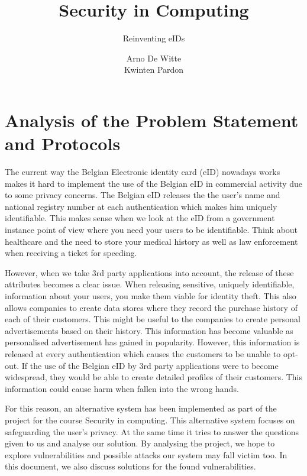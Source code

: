 \documentclass[12pt]{report}
\begin{document}
\title{Security in Computing}
\subtitle{Reinventing eIDs}
\author{Arno De Witte \\Kwinten Pardon}

\maketitle

\section{Analysis of the Problem Statement and Protocols}
The current way the Belgian Electronic identity card (eID) nowadays works makes it hard to implement the use of the Belgian eID in commercial activity due to some privacy concerns. The Belgian eID releases the the user's name and national registry number at each authentication which makes him uniquely identifiable. This makes sense when we look at the eID from a government instance point of view where you need your users to be identifiable. Think about healthcare and the need to store your medical history as well as law enforcement when receiving a ticket for speeding.

However, when we take 3rd party applications into account, the release of these attributes becomes a clear issue. When releasing sensitive, uniquely identifiable, information about your users, you make them viable for identity theft. This also allows companies to create data stores where they record the purchase history of each of their customers. This might be useful to the companies to create personal advertisements based on their history. This information has become valuable as personalised advertisement has gained in popularity. However, this information is released at every authentication which causes the customers to be unable to opt-out. If the use of the Belgian eID by 3rd party applications were to become widespread, they would be able to create detailed profiles of their customers. This information could cause harm when fallen into the wrong hands.

For this reason, an alternative system has been implemented as part of the project for the course Security in computing. This alternative system focuses on safeguarding the user's privacy. At the same time it tries to answer the questions given to us and analyse our solution. By analysing the project, we hope to explore vulnerabilities and possible attacks our system may fall victim too. In this document, we also discuss solutions for the found vulnerabilities.
\end{document}
